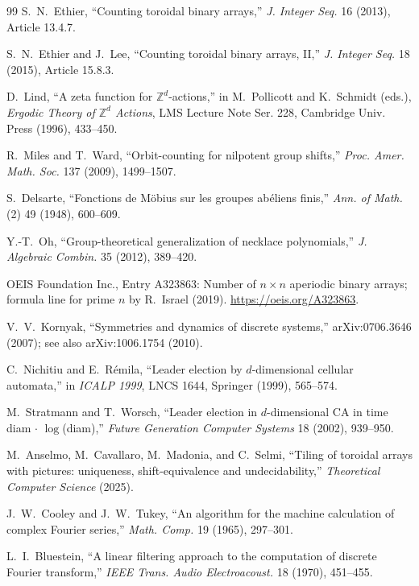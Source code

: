 \documentclass[11pt,a4paper]{article}
\theoremstyle{remark}
\newcommand{\ZZ}{\mathbb{Z}}
\begin{document}
\begin{thebibliography}{99}
S.~N.~Ethier,
``Counting toroidal binary arrays,''
\emph{J. Integer Seq.} 16 (2013), Article 13.4.7.

S.~N.~Ethier and J.~Lee,
``Counting toroidal binary arrays, II,''
\emph{J. Integer Seq.} 18 (2015), Article 15.8.3.

D.~Lind,
``A zeta function for $\ZZ^d$-actions,''
in M.~Pollicott and K.~Schmidt (eds.), \emph{Ergodic Theory of $\ZZ^d$
Actions}, LMS Lecture Note Ser. 228, Cambridge Univ. Press (1996), 433--450.

R.~Miles and T.~Ward,
``Orbit-counting for nilpotent group shifts,''
\emph{Proc. Amer. Math. Soc.} 137 (2009), 1499--1507.

S.~Delsarte,
``Fonctions de M\"obius sur les groupes ab\'eliens finis,''
\emph{Ann. of Math.} (2) 49 (1948), 600--609.

Y.-T.~Oh,
``Group-theoretical generalization of necklace polynomials,''
\emph{J. Algebraic Combin.} 35 (2012), 389--420.

OEIS Foundation Inc.,
Entry A323863: Number of $n\times n$ aperiodic binary arrays;
formula line for prime $n$ by R.~Israel (2019).
\url{https://oeis.org/A323863}.

V.~V.~Kornyak,
``Symmetries and dynamics of discrete systems,''
arXiv:0706.3646 (2007); see also arXiv:1006.1754 (2010).

C.~Nichitiu and E.~R\'emila,
``Leader election by $d$-dimensional cellular automata,''
in \emph{ICALP 1999}, LNCS 1644, Springer (1999), 565--574.

M.~Stratmann and T.~Worsch,
``Leader election in $d$-dimensional CA in time diam$\,\cdot\,\log$(diam),''
\emph{Future Generation Computer Systems} 18 (2002), 939--950.

M.~Anselmo, M.~Cavallaro, M.~Madonia, and C.~Selmi,
``Tiling of toroidal arrays with pictures: uniqueness, shift-equivalence
and undecidability,''
\emph{Theoretical Computer Science} (2025).

J.~W.~Cooley and J.~W.~Tukey,
``An algorithm for the machine calculation of complex Fourier series,''
\emph{Math. Comp.} 19 (1965), 297--301.

L.~I.~Bluestein,
``A linear filtering approach to the computation of discrete Fourier
transform,''
\emph{IEEE Trans. Audio Electroacoust.} 18 (1970), 451--455.


\end{thebibliography}
\end{document}
